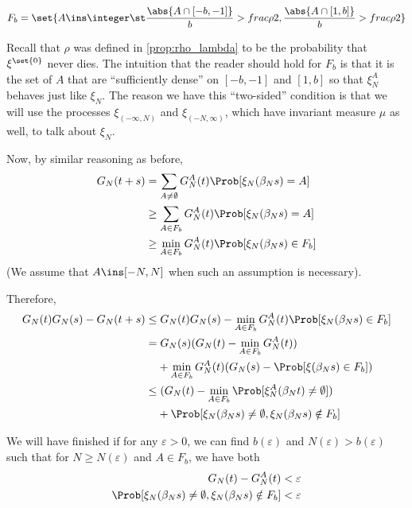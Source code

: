 \documentclass{scrartcl}
\newcommand{\ep}{\varepsilon}
\begin{document}
\[ F_{b} = \set{A \ins \integer \st \frac{\abs{A \cap [-b,-1]}}{b} > frac{\rho}{2}, \frac{\abs{A \cap [1,b]}}{b} > frac{\rho}{2}} \]

Recall that $\rho$ was defined in \ref{prop:rho_lambda} to be the probability that $\xi^{\set{0}}$ never dies. The intuition that the reader should hold for $F_{b}$ is that it is the set of $A$ that are ``sufficiently dense'' on $[-b,-1]$ and $[1,b]$ so that $\xi^{A}_{N}$ behaves just like $\xi_{N}$. The reason we have this ``two-sided'' condition is that we will use the processes $\xi_{(-\infty,N)}$ and $\xi_{(-N,\infty)}$, which have invariant measure $\mu$ as well, to talk about $\xi_{N}$.

Now, by similar reasoning as before,
\begin{align*}
  G_{N}(t+s) &= \sum_{A \neq \emptyset} G_{N}^{A}(t) \Prob[\xi_{N}(\beta_{N}s) = A] \\
  &\geq \sum_{A \in F_{b}} G_{N}^{A}(t) \Prob[\xi_{N}(\beta_{N}s) = A] \\
  &\geq \min_{A \in F_{b}} G_{N}^{A}(t) \Prob[\xi_{N}(\beta_{N}s) \in F_{b}]
\end{align*}
(We assume that $A \ins [-N,N]$ when such an assumption is necessary).

Therefore,
\begin{align*}
  G_{N}(t)G_{N}(s) - G_{N}(t+s) \leq& \; G_{N}(t)G_{N}(s) - \min_{A \in F_{b}} G_{N}^{A}(t) \Prob[\xi_{N}(\beta_{N}s) \in F_{b}] \\
  =& \; G_{N}(s)(G_{N}(t) - \min_{A \in F_{b}} G_{N}^{A}(t)) \\
                                 &+ \min_{A \in F_{b}} G_{N}^{A}(t)(G_{N}(s) - \Prob[\xi(\beta_{N}s) \in F_{b}]) \\
  \leq& \; (G_{N}(t) - \min_{A \in F_{b}} \Prob[\xi_{N}^{A}(\beta_{N}t) \neq \emptyset]) \\
                                 &+ \Prob[\xi_{N}(\beta_{N}s) \neq \emptyset, \xi_{N}(\beta_{N}s) \notin F_{b}]
\end{align*}

We will have finished if for any $\ep > 0$, we can find $b(\ep)$ and $N(\ep) > b(\ep)$  such that for $N \geq N(\ep)$ and $A \in F_{b}$, we have both
\begin{align}
  G_{N}(t) - G_{N}^{A}(t) &< \ep \label{eq:firstineq} \\
  \Prob[\xi_{N}(\beta_{N}s) \neq \emptyset, \xi_{N}(\beta_{N}s) \notin F_{b}] &< \ep \label{eq:secondineq}
\end{align}
\end{document}
